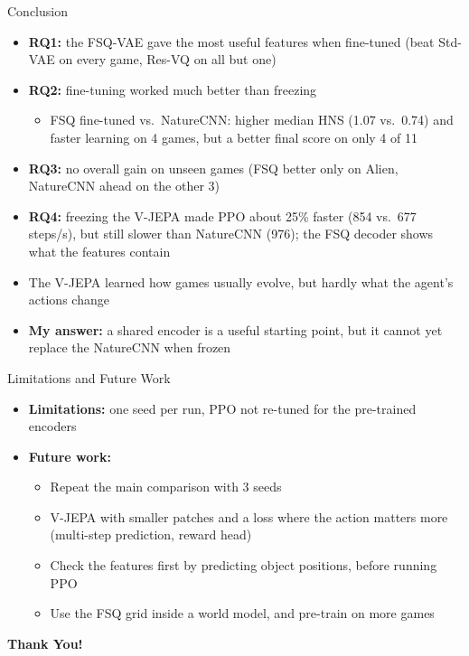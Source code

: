 \documentclass[aspectratio=43,10pt]{beamer}
\begin{document}
\begin{frame}{Conclusion}
  \begin{itemize}\setlength\itemsep{0.55em}
    \item \textbf{RQ1:} the FSQ-VAE gave the most useful features when fine-tuned (beat Std-VAE on every game,
          Res-VQ on all but one)
    \item \textbf{RQ2:} fine-tuning worked much better than freezing
      \begin{itemize}
        \item FSQ fine-tuned vs.\ NatureCNN: higher median HNS (1.07 vs.\ 0.74) and faster
              learning on 4 games, but a better final score on only 4 of 11
      \end{itemize}
    \item \textbf{RQ3:} no overall gain on unseen games (FSQ better only on Alien, NatureCNN
          ahead on the other 3)
    \item \textbf{RQ4:} freezing the V-JEPA made PPO about 25\% faster (854 vs.\ 677 steps/s),
          but still slower than NatureCNN (976); the FSQ decoder shows what the features contain
    \item The V-JEPA learned how games usually evolve, but hardly what the agent's actions change
    \item \textbf{My answer:} a shared encoder is a useful starting point, but it cannot yet
          replace the NatureCNN when frozen
  \end{itemize}
\end{frame}

\begin{frame}{Limitations and Future Work}
  \begin{itemize}\setlength\itemsep{0.55em}
    \item \textbf{Limitations:} one seed per run, PPO not re-tuned for the pre-trained encoders
    \item \textbf{Future work:}
      \begin{itemize}\setlength\itemsep{0.3em}
        \item Repeat the main comparison with 3 seeds
        \item V-JEPA with smaller patches and a loss where the action matters more
              (multi-step prediction, reward head)
        \item Check the features first by predicting object positions, before running PPO
        \item Use the FSQ grid inside a world model, and pre-train on more games
      \end{itemize}
  \end{itemize}
\end{frame}

\begin{frame}
  \vfill
  \centering
  {\Huge\bfseries Thank You!}
  \vfill
\end{frame}
\end{document}
